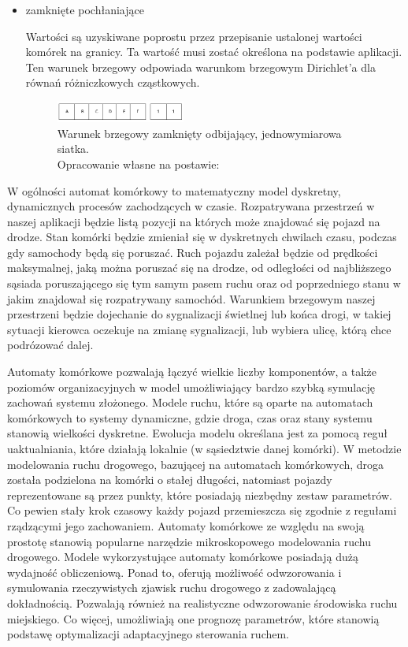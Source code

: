 \documentclass{sprawozdanie-agh}
\begin{document}
\begin{itemize}
				\item zamknięte pochłaniające
				
				Wartości są uzyskiwane poprostu przez przepisanie ustalonej wartości komórek na granicy. Ta wartość musi zostać określona na podstawie aplikacji. Ten warunek brzegowy odpowiada warunkom brzegowym Dirichlet'a dla równań różniczkowych cząstkowych.

				\begin{figure}[H]
					\centering
					\captionsetup{justification=centering}
					  \includegraphics[width=0.4\textwidth]{zamknietePoch}
					\caption{Warunek brzegowy zamknięty odbijający, jednowymiarowa siatka. \\ Opracowanie własne na postawie: \cite{warunkiBrzegowe}}
					\label{fig:closedPoch}
				\end{figure}

			\end{itemize}



		W ogólności automat komórkowy to matematyczny model dyskretny, dynamicznych procesów zachodzących w czasie. Rozpatrywana przestrzeń w naszej aplikacji będzie listą pozycji na których może znajdować się pojazd na drodze. Stan komórki będzie zmieniał się w dyskretnych chwilach czasu, podczas gdy samochody będą się poruszać. Ruch pojazdu zależał będzie od prędkości maksymalnej, jaką można poruszać się na drodze, od odległości od najbliższego sąsiada poruszającego się tym samym pasem ruchu oraz od poprzedniego stanu w jakim znajdował się rozpatrywany samochód. Warunkiem brzegowym naszej przestrzeni będzie dojechanie do sygnalizacji świetlnej lub końca drogi, w takiej sytuacji kierowca oczekuje na zmianę sygnalizacji, lub wybiera ulicę, którą chce podrózować dalej.

		Automaty komórkowe pozwalają łączyć wielkie liczby komponentów, a także poziomów organizacyjnych w model umożliwiający bardzo szybką symulację zachowań systemu złożonego. Modele ruchu, które są oparte na automatach komórkowych to systemy dynamiczne, gdzie droga, czas oraz stany systemu stanowią wielkości dyskretne. Ewolucja modelu określana jest za pomocą reguł uaktualniania, które działają lokalnie (w sąsiedztwie danej komórki). W metodzie modelowania ruchu drogowego, bazującej na automatach komórkowych, droga została podzielona na komórki o stałej długości, natomiast pojazdy reprezentowane są przez punkty, które posiadają niezbędny zestaw parametrów. Co pewien stały krok czasowy każdy pojazd przemieszcza się zgodnie z regułami rządzącymi jego zachowaniem. Automaty komórkowe ze względu na swoją prostotę stanowią popularne narzędzie mikroskopowego modelowania ruchu drogowego. Modele wykorzystujące automaty komórkowe posiadają dużą wydajność obliczeniową. Ponad to, oferują możliwość odwzorowania i symulowania rzeczywistych zjawisk ruchu drogowego z zadowalającą dokładnością. Pozwalają również na realistyczne odwzorowanie środowiska ruchu miejskiego. Co więcej, umożliwiają one prognozę parametrów, które stanowią podstawę optymalizacji adaptacyjnego sterowania ruchem.
\end{document}
